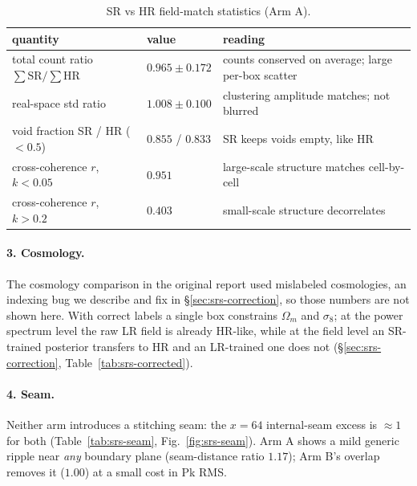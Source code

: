 \begin{table}[h]
\centering
\caption{SR vs HR field-match statistics (Arm A).}
\label{tab:srs-match}
\begin{tabular}{lll}
\toprule
quantity & value & reading \\
\midrule
total count ratio $\sum\mathrm{SR}/\sum\mathrm{HR}$ & $0.965\pm0.172$ & counts conserved on average; large per-box scatter \\
real-space std ratio & $1.008\pm0.100$ & clustering amplitude matches; not blurred \\
void fraction SR / HR ($<0.5$) & $0.855$ / $0.833$ & SR keeps voids empty, like HR \\
cross-coherence $r$, $k<0.05$ & $0.951$ & large-scale structure matches cell-by-cell \\
cross-coherence $r$, $k>0.2$ & $0.403$ & small-scale structure decorrelates \\
\bottomrule
\end{tabular}
\end{table}

\paragraph{3. Cosmology.} The cosmology comparison in the original report used
mislabeled cosmologies, an indexing bug we describe and fix in
\S\ref{sec:srs-correction}, so those numbers are not shown here. With correct
labels a single box constrains $\Omega_m$ and $\sigma_8$; at the power spectrum
level the raw LR field is already HR-like, while at the field level an SR-trained
posterior transfers to HR and an LR-trained one does not
(\S\ref{sec:srs-correction}, Table~\ref{tab:srs-corrected}).

\paragraph{4. Seam.} Neither arm introduces a stitching seam: the $x{=}64$
internal-seam excess is $\approx1$ for both
(Table~\ref{tab:srs-seam}, Fig.~\ref{fig:srs-seam}). Arm A shows a mild generic
ripple near \emph{any} boundary plane (seam-distance ratio $1.17$); Arm B's
overlap removes it ($1.00$) at a small cost in Pk RMS.

